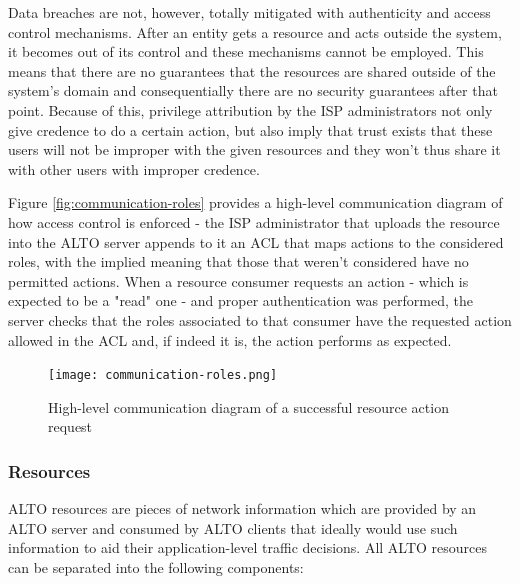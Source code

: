     Data breaches are not, however, totally mitigated with authenticity and access control mechanisms.
    After an entity gets a resource and acts outside the system, it becomes out of its control and these mechanisms cannot be employed.
    This means that there are no guarantees that the resources are shared outside of the system's domain and consequentially there are no security guarantees after that point.
    Because of this, privilege attribution by the ISP administrators not only give credence to do a certain action, but also imply that trust exists that these users will not be improper with the given resources and they won't thus share it with other users with improper credence.

    Figure \ref{fig:communication-roles} provides a high-level communication diagram of how access control is enforced - the ISP administrator that uploads the resource into the ALTO server appends to it an ACL that maps actions to the considered roles, with the implied meaning that those that weren't considered have no permitted actions.
    When a resource consumer requests an action - which is expected to be a "read" one - and proper authentication was performed, the server checks that the roles associated to that consumer have the requested action allowed in the ACL and, if indeed it is, the action performs as expected.

\begin{figure}[h]
        \centering
        \texttt{[image: communication-roles.png]}
        \caption{High-level communication diagram of a successful resource action request}
        \label{fig:macro-architecture}
\end{figure}

\subsubsection{Resources}
\label{ssec:alto-resources}

    ALTO resources are pieces of network information which are provided by an ALTO server and consumed by ALTO clients that ideally would use such information to aid their application-level traffic decisions.
    All ALTO resources can be separated into the following components:

